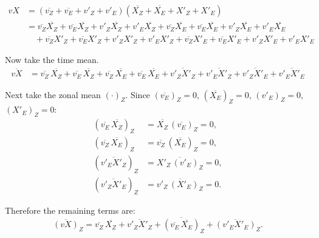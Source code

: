 \documentclass[11pt,a4paper]{article}
\begin{document}
\begin{solution}
\begin{align*}
    v X &=
    (\overline{v_Z} + \overline{v_E} + v'_Z + v'_E)(\overline{X_Z} + \overline{X_E} + X'_Z + X'_E)\\
    &=\overline{v_Z}\overline{X_Z} + \overline{v_E}\overline{X_Z} + v'_Z\overline{X_Z} + v'_E\overline{X_Z}
    + \overline{v_Z}\overline{X_E} + \overline{v_E}\overline{X_E} + v'_Z\overline{X_E} + v'_E\overline{X_E}    \\
    &\quad +\overline{v_Z}X'_Z + \overline{v_E}X'_Z + v'_ZX'_Z + v'_EX'_Z
    +\overline{v_Z}X'_E + \overline{v_E}X'_E + v'_ZX'_E + v'_EX'_E
\end{align*}

Now take the time mean.
%
\begin{align*}
    \overline{vX}
    &= \overline{v_Z}\,\overline{X_Z}
     + \overline{v_E}\,\overline{X_Z}
     + \overline{v_Z}\,\overline{X_E}
     + \overline{v_E}\,\overline{X_E}
     + \overline{v'_Z X'_Z}
     + \overline{v'_E X'_Z}
     + \overline{v'_Z X'_E}
     + \overline{v'_E X'_E}
\end{align*}

Next take the zonal mean $(\cdot)_Z$.  Since $(\overline{v_E})_Z = 0$, $(\overline{X_E})_Z = 0$, $(v'_E)_Z = 0$, $(X'_E)_Z = 0$:
%
\begin{align*}
    (\overline{v_E}\,\overline{X_Z})_Z
        &= \overline{X_Z}\,(\overline{v_E})_Z = 0, \\
    (\overline{v_Z}\,\overline{X_E})_Z
        &= \overline{v_Z}\,(\overline{X_E})_Z = 0, \\
    (\overline{v'_E X'_Z})_Z
        &= \overline{X'_Z\,(v'_E)_Z} = 0, \\
    (\overline{v'_Z X'_E})_Z
        &= \overline{v'_Z\,(X'_E)_Z} = 0.
\end{align*}

Therefore the remaining terms are:
%
\begin{equation*}
    \overline{(vX)}_Z
    = \overline{v_Z}\,\overline{X_Z}
    + \overline{v'_Z X'_Z}
    + \overline{(\overline{v_E}\,\overline{X_E})}_Z
    + \overline{(v'_E X'_E)}_Z.
\end{equation*}
\end{solution}
\end{document}
